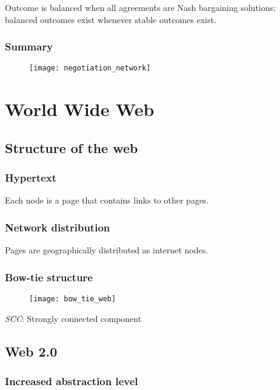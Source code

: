 Outcome is balanced when all agreements are Nash bargaining solutions; balanced outcomes exist whenever stable outcomes exist.

\subsection{Summary}

\begin{figure}[H]
    \centering
    \texttt{[image: negotiation\_network]}
\end{figure}

\chapter{World Wide Web}

\section{Structure of the web}

\subsection{Hypertext}

Each node is a page that contains links to other pages.

\subsection{Network distribution}

Pages are geographically distributed as internet nodes.

\subsection{Bow-tie structure}

\begin{figure}[H]
    \centering
    \texttt{[image: bow\_tie\_web]}
\end{figure}

\textit{SCC}: Strongly connected component

\section{Web 2.0}

\subsection{Increased abstraction level}

